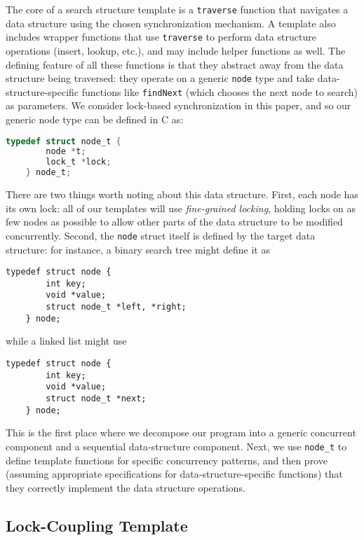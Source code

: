 \documentclass[sigplan,screen]{acmart}
\begin{document}
The core of a search structure template is a \lstinline{traverse} function that navigates a data structure using the chosen synchronization mechanism. A template also includes wrapper functions that use \lstinline{traverse} to perform data structure operations (insert, lookup, etc.), and may include helper functions as well. The defining feature of all these functions is that they abstract away from the data structure being traversed: they operate on a generic \lstinline{node} type and take data-structure-specific functions like \lstinline{findNext} (which chooses the next node to search) as parameters. We consider lock-based synchronization in this paper, and so our generic node type can be defined in C as:
\begin{lstlisting}[style=myStyle,language = C, backgroundcolor=\color{white}, basicstyle=\ttfamily\footnotesize, numbers=none, xleftmargin=0.5em]
	typedef struct node_t {
		node *t; 
		lock_t *lock;
	} node_t;
\end{lstlisting}
There are two things worth noting about this data structure. First, each node has its own lock: all of our templates will use \emph{fine-grained locking}, holding locks on as few nodes as possible to allow other parts of the data structure to be modified concurrently. Second, the \lstinline{node} struct itself is defined by the target data structure: for instance, a binary search tree might define it as 
\begin{lstlisting}[style=myStyle, numbers=none, xleftmargin=0.5em]
	typedef struct node {
		int key; 
		void *value; 
		struct node_t *left, *right;
	} node;
\end{lstlisting}
while a linked list might use
\begin{lstlisting}[style=myStyle, numbers=none, xleftmargin=0.5em]
	typedef struct node {
		int key; 
		void *value; 
		struct node_t *next;
	} node;
\end{lstlisting}
This is the first place where we decompose our program into a generic concurrent component and a sequential data-structure component. Next, we use \lstinline{node_t} to define template functions for specific concurrency patterns, and then prove (assuming appropriate specifications for data-structure-specific functions) that they correctly implement the data structure operations.

\subsection{Lock-Coupling Template}
\label{lock-coupling-algo}
\end{document}
